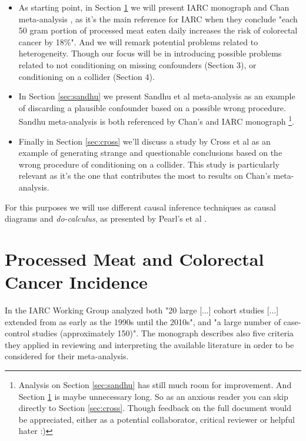 \documentclass{article}
\begin{document}
\begin{itemize}

\item As starting point, in Section \ref{sec:iarc} we will present IARC monograph and Chan meta-analysis \cite{chan}, as it's the main reference for IARC when they conclude "each 50 gram portion of processed meat eaten daily increases the risk of colorectal cancer by 18\%". And we will remark potential problems related to heterogeneity. Though our focus will be in introducing possible problems related to not conditioning on missing confounders (Section 3), or conditioning on a collider (Section 4).
\item In Section \ref{sec:sandhu} we present Sandhu et al meta-analysis \cite{sandhu} as an example of discarding a plausible confounder based on a possible wrong procedure. Sandhu meta-analysis is both referenced by Chan's \cite{chan} and IARC monograph \cite{monograph} \footnote{Analysis on Section \ref{sec:sandhu} has still much room for improvement. And Section \ref{sec:iarc} is maybe unnecessary long. So as an anxious reader you can skip directly to Section \ref{sec:cross}. Though feedback on the full document would be appreciated, either as a potential collaborator, critical reviewer or helpful hater :)}.
\item Finally in Section \ref{sec:cross} we'll discuss a study by Cross et al \cite{cross} as an example of generating strange and questionable conclusions based on the wrong procedure of conditioning on a collider. This study is particularly relevant as it's the one that contributes the most to results on Chan's meta-analysis.
\end{itemize}

For this purposes we will use different causal inference techniques as causal diagrams and \textit{do-calculus}, as presented by Pearl's et al \cite{bookofwhy}.

\section{Processed Meat and Colorectal Cancer Incidence}
\label{sec:iarc}

In \cite{monograph} the IARC Working Group analyzed both "20 large [...] cohort studies [...] extended from as early as the 1990s until the 2010s", and "a large number of case-control studies (approximately 150)". The monograph describes also five criteria they applied in reviewing and interpreting the available literature in order to be considered for their meta-analysis. %
\end{document}
